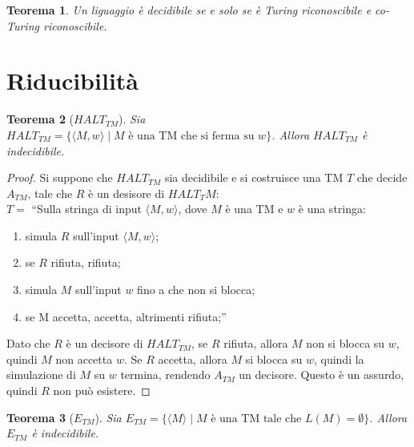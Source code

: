 \documentclass[11pt]{article}
\newtheorem{theorem}{Teorema}[section]
\newtheorem{proof}{Dimostrazione}[section]
\begin{document}
\begin{theorem}
	Un liguaggio è decidibile se e solo se è Turing riconoscibile e co-Turing
	riconoscibile.
\end{theorem}

\section{Riducibilità}

\begin{theorem}[$HALT_{TM}$]
	Sia $HALT_{TM} = \{\langle M, w \rangle \mid M \text{ è una TM che si ferma
	su } w\}$. Allora $HALT_{TM}$ è indecidibile.
\end{theorem}

\begin{proof}
Si suppone che $HALT_{TM}$ sia decidibile e si costruisce una TM
$T$ che decide $A_{TM}$, tale che $R$ è un desisore di $HALT_TM$:\\
$T = $ ``Sulla stringa di input $\langle M, w \rangle$, dove $M$ è una TM e
$w$ è una stringa:
\begin{enumerate}
	\item simula $R$ sull'input $\langle M, w \rangle$;
	\item se $R$ rifiuta, rifiuta;
	\item simula $M$ sull'input $w$ fino a che non si blocca;
	\item se M accetta, accetta, altrimenti rifiuta;''
\end{enumerate}

Dato che $R$ è un decisore di $HALT_{TM}$, se $R$ rifiuta, allora $M$ non si
blocca su $w$, quindi $M$ non accetta $w$. Se $R$ accetta, allora $M$ si blocca
su $w$, quindi la simulazione di $M$ su $w$ termina, rendendo $A_{TM}$ un
decisore. Questo è un assurdo, quindi $R$ non può esistere.
\end{proof}

\begin{theorem}[$E_{TM}$]
	Sia $E_{TM} = \{\langle M \rangle \mid M \text{ è una TM tale che } L(M) = 
	\emptyset\}$. Allora $E_{TM}$ è indecidibile.
\end{theorem}
\end{document}
